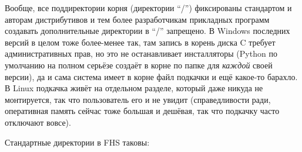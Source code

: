 \documentclass{../../text-style}
\begin{document}
Вообще, все поддиректории корня (директории \enquote{/}) фиксированы стандартом и авторам дистрибутивов и тем более разработчикам прикладных программ создавать дополнительные директории в \enquote{/} запрещено.
В Windows последних версий в целом тоже более-менее так, там запись в корень диска C требует административных прав, но это не останавливает инсталляторы (Python по умолчанию на полном серьёзе создаёт в корне по папке для \emph{каждой} своей версии), да и сама система имеет в корне файл подкачки и ещё какое-то барахло.
В Linux подкачка живёт на отдельном разделе, который даже никуда не монтируется, так что пользователь его и не увидит (справедливости ради, оперативная память сейчас тоже большая и дешёвая, так что подкачку часто отключают вовсе).

Стандартные директории в FHS таковы:
\end{document}
